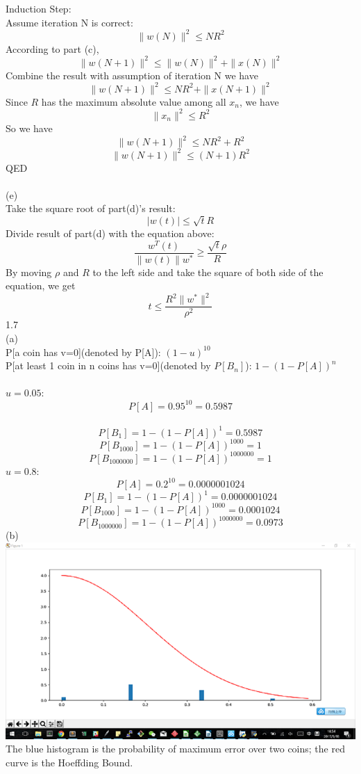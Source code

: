 \documentclass[12pt]{article}
\begin{document}
Induction Step:\\
Assume iteration N is correct: $$\parallel w(N)\parallel ^2\leq NR^2$$
According to part (c), $$\parallel w(N+1)\parallel ^2 \leq \parallel w(N)\parallel ^2+\parallel x(N)\parallel ^2$$
Combine the result with assumption of iteration N we have $$\parallel w(N+1)\parallel ^2\leq NR^2+\parallel x(N+1)\parallel ^2$$
Since $R$ has the maximum absolute value among all $x_n$, we have $$\parallel x_n\parallel ^2\leq R^2$$
So we have $$\parallel w(N+1)\parallel ^2\leq NR^2+R^2$$
$$\parallel w(N+1)\parallel ^2\leq (N+1)R^2$$
QED\\\\
(e)\\
Take the square root of part(d)'s result: $$|w(t)|\leq \sqrt{t}R$$
Divide result of part(d) with the equation above:
$$\frac{w^T(t)}{{\parallel w(t)\parallel }w^*}\geq \frac{\sqrt{t}\rho}{R}$$
By moving $\rho$ and $R$ to the left side and take the square of both side of the equation, we get $$t\leq \frac{R^2\parallel w^*\parallel ^2}{\rho^2}$$
1.7\\%
(a)\\%
P[a coin has v=0](denoted by P[A]): $(1-u)^{10}$\\
P[at least 1 coin in n coins has v=0](denoted by $P[B_n]$): $1-(1-P[A])^n$\\\\
$u=0.05$:
$$P[A]=0.95^{10} = 0.5987 $$\\
$$P[B_1]=1-(1-P[A])^1 = 0.5987$$
$$P[B_{1000}]=1-(1-P[A])^{1000} = 1$$
$$P[B_{1000000}]=1-(1-P[A])^{1000000} = 1$$
$u=0.8$:\\
$$P[A]=0.2^{10} = 0.0000001024$$
$$P[B_1]=1-(1-P[A])^1 = 0.0000001024$$
$$P[B_{1000}]=1-(1-P[A])^{1000} = 0.0001024$$
$$P[B_{1000000}]=1-(1-P[A])^{1000000} = 0.0973$$
(b)\\%
\includegraphics[scale=0.6]{1-7b}\\
The blue histogram is the probability of maximum error over two coins; the red curve is the Hoeffding Bound.\\ 
\end{document}
